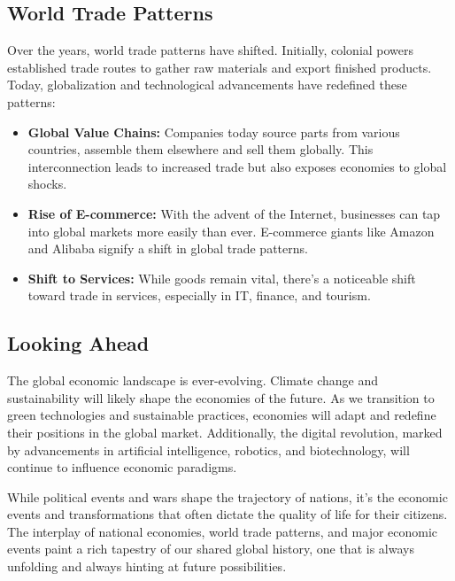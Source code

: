 \subsection*{World Trade Patterns}
Over the years, world trade patterns have shifted. Initially, colonial powers established trade routes to gather raw materials and export finished products. Today, globalization and technological advancements have redefined these patterns:
\begin{itemize}
    \item \textbf{Global Value Chains:} Companies today source parts from various countries, assemble them elsewhere and sell them globally. This interconnection leads to increased trade but also exposes economies to global shocks.
    \item \textbf{Rise of E-commerce:} With the advent of the Internet, businesses can tap into global markets more easily than ever. E-commerce giants like Amazon and Alibaba signify a shift in global trade patterns.
    \item \textbf{Shift to Services:} While goods remain vital, there's a noticeable shift toward trade in services, especially in IT, finance, and tourism.
\end{itemize}

\subsection*{Looking Ahead}
The global economic landscape is ever-evolving. Climate change and sustainability will likely shape the economies of the future. As we transition to green technologies and sustainable practices, economies will adapt and redefine their positions in the global market. Additionally, the digital revolution, marked by advancements in artificial intelligence, robotics, and biotechnology, will continue to influence economic paradigms.

While political events and wars shape the trajectory of nations, it's the economic events and transformations that often dictate the quality of life for their citizens. The interplay of national economies, world trade patterns, and major economic events paint a rich tapestry of our shared global history, one that is always unfolding and always hinting at future possibilities.

